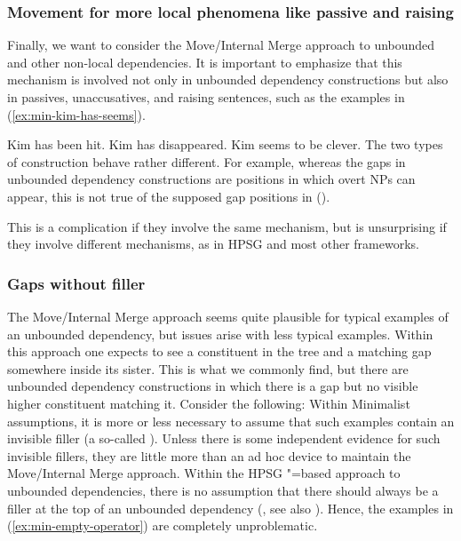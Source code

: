 \documentclass[output=paper]{langsci/langscibook}
\begin{document}
\subsubsection{Movement for more local phenomena like passive and raising}
\label{sec-passive-raising-minimalism}

Finally, we want to consider the Move/Internal Merge approach to unbounded and other non-local
dependencies. It is important to emphasize that this mechanism is involved not only in unbounded
dependency constructions but also in passives, unaccusatives, and raising sentences, such as the
examples in (\ref{ex:min-kim-has-seems}). 

\eal\label{ex:min-kim-has-seems}
\ex Kim has been hit.
\ex Kim has disappeared.
\ex Kim seems to be clever.
\zl
The two types of construction behave rather different. For example, whereas the gaps in unbounded
dependency constructions are positions in which overt NPs can appear, this is not true of the
supposed gap positions in (). 

\eal
{}
\zl 
This is a complication
 if they involve the same mechanism, but is unsurprising if they involve different mechanisms, as in HPSG and most other frameworks.

\subsubsection{Gaps without filler}

The Move/Internal Merge approach seems quite plausible for typical examples of an unbounded
dependency, but issues arise with less typical examples. Within this approach one expects to see a
constituent in the tree and a matching gap somewhere inside its sister. This is what we commonly
find, but there are unbounded dependency constructions in which there is a gap but no visible higher
constituent matching it. Consider \eg the following: 
\eal\label{ex:min-empty-operator}
\zl 
Within Minimalist assumptions, it is more or less necessary to assume that such examples contain an
invisible filler (a so-called ). Unless there is some independent evidence for such
invisible fillers, they are little more than an ad hoc device to maintain the Move/Internal Merge
approach. Within the HPSG \slasch"=based approach to unbounded dependencies, there is no assumption
that there should always be a filler at the top of an unbounded dependency (\citealp[Chapter~4]{ps2}, see also ). Hence, the examples in
(\ref{ex:min-empty-operator}) are completely unproblematic. 
\end{document}
